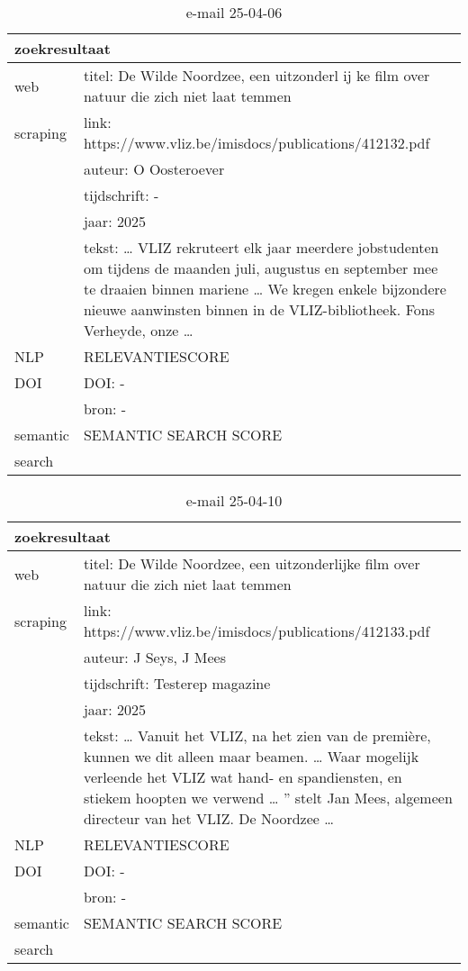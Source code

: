 \begin{table}[h!]
    \caption{e-mail 25-04-06}
    \centering
    \begin{tabularx}{\textwidth}{|p{4cm}|X|} 
        \hline
        \multicolumn{2}{|X|}{\textbf{zoekresultaat}} \\
        \hline
        web &titel: De Wilde Noordzee, een uitzonderl ij ke film over natuur die zich niet laat temmen\\
        scraping&link: https://www.vliz.be/imisdocs/publications/412132.pdf\\
        &auteur: O Oosteroever\\
        &tijdschrift: -\\
        &jaar: 2025\\
        &tekst: … VLIZ rekruteert elk jaar meerdere jobstudenten om tijdens de maanden juli, augustus en september mee te draaien binnen mariene … We kregen enkele bijzondere nieuwe aanwinsten binnen in de VLIZ-bibliotheek. Fons Verheyde, onze …\\
        \hline
        NLP&RELEVANTIESCORE\\
        \hline
        DOI&DOI: -\\
        &bron: -\\
        \hline
        semantic&SEMANTIC SEARCH SCORE\\
        search&\\
        \hline
    \end{tabularx}
    \label{table:email20250406}
\end{table}
\begin{table}[h!]
    \caption{e-mail 25-04-10}
    \centering
    \begin{tabularx}{\textwidth}{|p{4cm}|X|} 
        \hline
        \multicolumn{2}{|X|}{\textbf{zoekresultaat}} \\
        \hline
        web &titel: De Wilde Noordzee, een uitzonderlijke film over natuur die zich niet laat temmen\\
        scraping&link: https://www.vliz.be/imisdocs/publications/412133.pdf\\
        &auteur:  J Seys, J Mees\\
        &tijdschrift: Testerep magazine\\
        &jaar: 2025\\
        &tekst: … Vanuit het VLIZ, na het zien van de première, kunnen we dit alleen maar beamen. … Waar mogelijk verleende het VLIZ wat hand- en spandiensten, en stiekem hoopten we verwend … ” stelt Jan Mees, algemeen directeur van het VLIZ. De Noordzee …\\
        \hline
        NLP&RELEVANTIESCORE\\
        \hline
        DOI&DOI: -\\
        &bron: -\\
        \hline
        semantic&SEMANTIC SEARCH SCORE\\
        search&\\
        \hline
    \end{tabularx}
    \label{table:email20250410}
\end{table}
